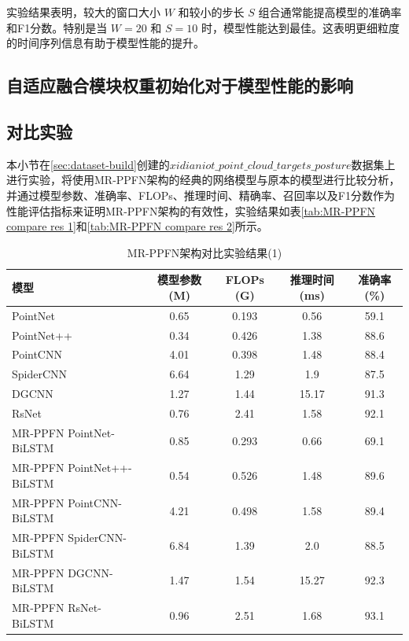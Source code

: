 
实验结果表明，较大的窗口大小 \( W \) 和较小的步长 \( S \) 组合通常能提高模型的准确率和F1分数。特别是当 \( W = 20 \) 和 \( S = 10 \) 时，模型性能达到最佳。这表明更细粒度的时间序列信息有助于模型性能的提升。


\subsection{自适应融合模块权重初始化对于模型性能的影响}

\subsection{对比实验}
本小节在\eqref{sec:dataset-build}创建的$xidianiot\_point\_cloud\_targets\_posture$数据集上进行实验，将使用MR-PPFN架构的经典的网络模型与原本的模型进行比较分析，并通过模型参数、准确率、FLOPs、推理时间、精确率、召回率以及F1分数作为性能评估指标来证明MR-PPFN架构的有效性，实验结果如表\eqref{tab:MR-PPFN compare res 1}和\eqref{tab:MR-PPFN compare res 2}所示。
\begin{table}[htbp]
    \centering
    \caption{MR-PPFN架构对比实验结果(1)}
    \label{tab:MR-PPFN compare res 1}
    \begin{tabular}{lcccc}
        \toprule
        \textbf{模型} & \textbf{模型参数 (M)} & \textbf{FLOPs (G)} & \textbf{推理时间 (ms)} & \textbf{准确率 (\%)} \\
        \midrule
        PointNet & 0.65 & 0.193 & 0.56 & 59.1 \\
        PointNet++ & 0.34 & 0.426 & 1.38 & 88.6 \\
        PointCNN & 4.01 & 0.398 & 1.48 & 88.4 \\
        SpiderCNN & 6.64 & 1.29 & 1.9 & 87.5 \\
        DGCNN & 1.27 & 1.44 & 15.17 & 91.3 \\
        RsNet & 0.76 & 2.41 & 1.58 & 92.1 \\
        MR-PPFN PointNet-BiLSTM & 0.85 & 0.293 & 0.66 & 69.1 \\
        MR-PPFN PointNet++-BiLSTM & 0.54 & 0.526 & 1.48 & 89.6 \\
        MR-PPFN PointCNN-BiLSTM & 4.21 & 0.498 & 1.58 & 89.4 \\
        MR-PPFN SpiderCNN-BiLSTM & 6.84 & 1.39 & 2.0 & 88.5 \\
        MR-PPFN DGCNN-BiLSTM & 1.47 & 1.54 & 15.27 & 92.3 \\
        MR-PPFN RsNet-BiLSTM & 0.96 & 2.51 & 1.68 & 93.1 \\
        \bottomrule
    \end{tabular}
\end{table}

